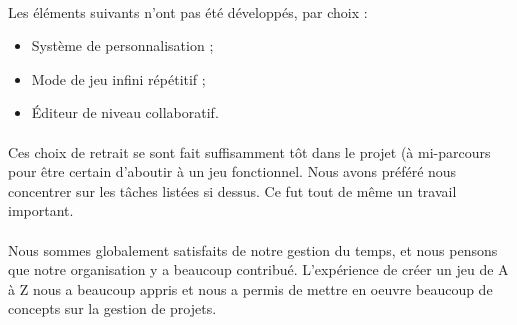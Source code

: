 \paragraph{}
Les éléments suivants n'ont pas été développés, par choix :
\begin{itemize}
\item Système de personnalisation ;
\item Mode de jeu infini répétitif ;
\item Éditeur de niveau collaboratif.
\end{itemize}

\paragraph{}
Ces choix de retrait se sont fait suffisamment tôt dans le projet (à mi-parcours pour être certain d'aboutir à un jeu fonctionnel. Nous avons préféré nous concentrer sur les tâches listées si dessus. Ce fut tout de même un travail important.

\paragraph{}
Nous sommes globalement satisfaits de notre gestion du temps, et nous pensons que notre organisation y a beaucoup contribué.
L'expérience de créer un jeu de A à Z nous a beaucoup appris et nous a permis de mettre en oeuvre beaucoup de concepts sur la gestion de projets.



